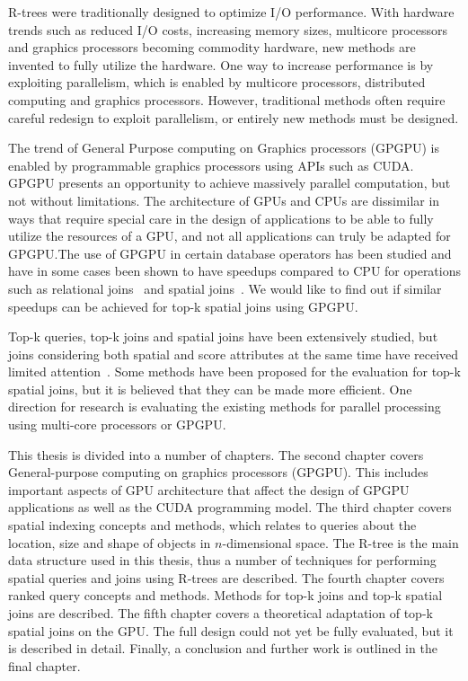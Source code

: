 R-trees were traditionally designed to optimize I/O performance. With hardware trends such as reduced I/O costs, increasing memory sizes, multicore processors and graphics processors becoming commodity hardware, new methods are invented to fully utilize the hardware. One way to increase performance is by exploiting parallelism, which is enabled by multicore processors, distributed computing and graphics processors. However, traditional methods often require careful redesign to exploit parallelism, or entirely new methods must be designed.

The trend of General Purpose computing on Graphics processors (GPGPU) is enabled by programmable graphics processors using APIs such as CUDA\@. GPGPU presents an opportunity to achieve massively parallel computation, but not without limitations. The architecture of GPUs and CPUs are dissimilar in ways that require special care in the design of applications to be able to fully utilize the resources of a GPU, and not all applications can truly be adapted for GPGPU.\@ The use of GPGPU in certain database operators has been studied and have in some cases been shown to have speedups compared to CPU for operations such as relational joins~\cite{he2008relational} and spatial joins~\cite{yampaka2012spatial}. We would like to find out if similar speedups can be achieved for top-k spatial joins using GPGPU.\@

Top-k queries, top-k joins and spatial joins have been extensively studied, but joins considering both spatial and score attributes at the same time have received limited attention~\cite{qi2013efficient}. Some methods have been proposed for the evaluation for top-k spatial joins, but it is believed that they can be made more efficient. One direction for research is evaluating the existing methods for parallel processing using multi-core processors or GPGPU.

This thesis is divided into a number of chapters. The second chapter covers General-purpose computing on graphics processors (GPGPU). This includes important aspects of GPU architecture that affect the design of GPGPU applications as well as the CUDA programming model. The third chapter covers spatial indexing concepts and methods, which relates to queries about the location, size and shape of objects in \(n\)-dimensional space. The R-tree is the main data structure used in this thesis, thus a number of techniques for performing spatial queries and joins using R-trees are described. The fourth chapter covers ranked query concepts and methods. Methods for top-k joins and top-k spatial joins are described. The fifth chapter covers a theoretical adaptation of top-k spatial joins on the GPU. The full design could not yet be fully evaluated, but it is described in detail. Finally, a conclusion and further work is outlined in the final chapter.

